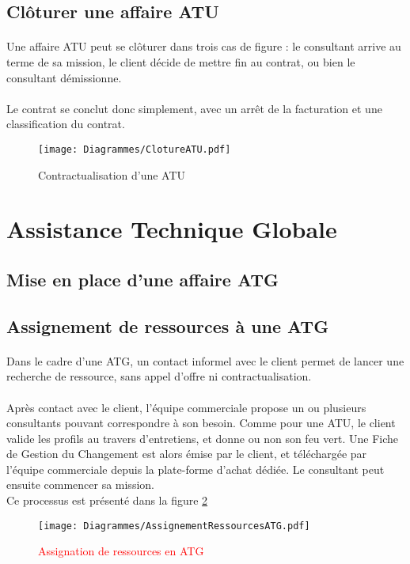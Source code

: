 \subsection{Clôturer une affaire ATU}

\paragraph{} Une affaire ATU peut se clôturer dans trois cas de figure : le consultant arrive au terme de sa mission, le client décide de mettre fin au contrat, ou bien 
le consultant démissionne.
\paragraph{} Le contrat se conclut donc simplement, avec un arrêt de la facturation et une classification du contrat.

\begin{figure}[H]
	\centering
	\texttt{[image: Diagrammes/ClotureATU.pdf]}
	\caption{Contractualisation d'une ATU} 
	\label{contractATU}
\end{figure}




\section{Assistance Technique Globale}

\subsection{Mise en place d'une affaire ATG}

\subsection{Assignement de ressources à une ATG}

\paragraph{} Dans le cadre d'une ATG, un contact informel avec le client permet de lancer une recherche de ressource, sans appel d'offre ni contractualisation.\\
\paragraph{}Après contact avec le client, l'équipe commerciale propose un ou plusieurs consultants pouvant correspondre à son besoin. Comme pour une ATU, le client valide les profils au travers d'entretiens, et donne ou non son feu vert. Une Fiche de Gestion du Changement est alors émise par le client, et téléchargée par l'équipe commerciale depuis la plate-forme d'achat dédiée. Le consultant peut ensuite commencer sa mission.\\
Ce processus est présenté dans la figure \ref{asgtRcesATG}



\begin{figure}[H]
	\centering
	\texttt{[image: Diagrammes/AssignementRessourcesATG.pdf]}
	\caption{\textcolor{red}{Assignation de ressources en ATG}} 
	\label{asgtRcesATG}
\end{figure}


